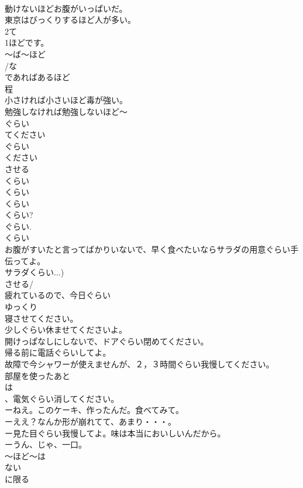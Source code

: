 \documentclass[8pt]{extreport}
\begin{document}
\begin{CJK}{UTF8}{min}
\\	動けないほどお腹がいっぱいだ。 
\\	東京はびっくりするほど人が多い。
\\	2て
\\	1ほどです。
\\	～ば～ほど
\\	/な
\\	であればあるほど
\\	程　
\\	小さければ小さいほど毒が強い。　
\\	勉強しなければ勉強しないほど～
\\	ぐらい
\\	てください
\\	ぐらい
\\	ください
\\	させる 
\\	くらい
\\	くらい
\\	くらい
\\	くらい? 
\\	ぐらい.
\\	くらい
\\	お腹がすいたと言ってばかりいないで、早く食べたいならサラダの用意ぐらい手伝ってよ。
\\	サラダくらい...)
\\	させる/
\\	疲れているので、今日ぐらい
\\	ゆっくり
\\	寝させてください。
\\	少しぐらい休ませてくださいよ。
\\	開けっぱなしにしないで、ドアぐらい閉めてください。
\\	帰る前に電話ぐらいしてよ。
\\	故障で今シャワーが使えませんが、２，３時間ぐらい我慢してください。
\\	部屋を使ったあと
\\	は
\\	、電気ぐらい消してください。
\\	ーねえ。このケーキ、作ったんだ。食べてみて。
\\	ーええ？なんか形が崩れてて、あまり・・・。
\\	ー見た目ぐらい我慢してよ。味は本当においしいんだから。
\\	ーうん、じゃ、一口。
\\	～ほど～は
\\	ない
\\	に限る

\end{CJK}
\end{document}
